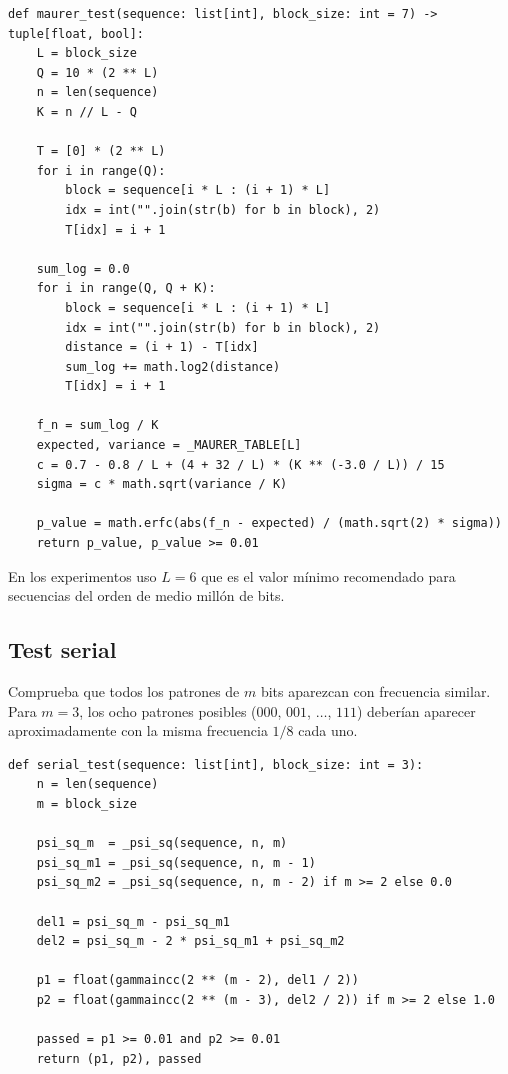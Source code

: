 \begin{lstlisting}[style=Python,caption={Test universal de Maurer (extracto, \texttt{src/tests\_nist/maurer.py}).}]
def maurer_test(sequence: list[int], block_size: int = 7) -> tuple[float, bool]:
    L = block_size
    Q = 10 * (2 ** L)
    n = len(sequence)
    K = n // L - Q

    T = [0] * (2 ** L)
    for i in range(Q):
        block = sequence[i * L : (i + 1) * L]
        idx = int("".join(str(b) for b in block), 2)
        T[idx] = i + 1

    sum_log = 0.0
    for i in range(Q, Q + K):
        block = sequence[i * L : (i + 1) * L]
        idx = int("".join(str(b) for b in block), 2)
        distance = (i + 1) - T[idx]
        sum_log += math.log2(distance)
        T[idx] = i + 1

    f_n = sum_log / K
    expected, variance = _MAURER_TABLE[L]
    c = 0.7 - 0.8 / L + (4 + 32 / L) * (K ** (-3.0 / L)) / 15
    sigma = c * math.sqrt(variance / K)

    p_value = math.erfc(abs(f_n - expected) / (math.sqrt(2) * sigma))
    return p_value, p_value >= 0.01
\end{lstlisting}

En los experimentos uso $L = 6$ que es el valor mínimo recomendado para secuencias del orden de medio millón de bits.

\subsection{Test serial}

Comprueba que todos los patrones de $m$ bits aparezcan con frecuencia similar. Para $m = 3$, los ocho patrones posibles ($000$, $001$, $\ldots$, $111$) deberían aparecer
aproximadamente con la misma frecuencia $1/8$ cada uno.

\begin{lstlisting}[style=Python,caption={Test serial (\texttt{src/tests\_nist/serial.py}).}]
def serial_test(sequence: list[int], block_size: int = 3):
    n = len(sequence)
    m = block_size

    psi_sq_m  = _psi_sq(sequence, n, m)
    psi_sq_m1 = _psi_sq(sequence, n, m - 1)
    psi_sq_m2 = _psi_sq(sequence, n, m - 2) if m >= 2 else 0.0

    del1 = psi_sq_m - psi_sq_m1
    del2 = psi_sq_m - 2 * psi_sq_m1 + psi_sq_m2

    p1 = float(gammaincc(2 ** (m - 2), del1 / 2))
    p2 = float(gammaincc(2 ** (m - 3), del2 / 2)) if m >= 2 else 1.0

    passed = p1 >= 0.01 and p2 >= 0.01
    return (p1, p2), passed
\end{lstlisting}

